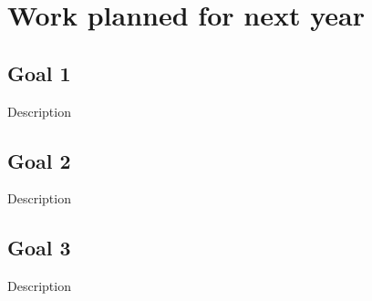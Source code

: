 \documentclass[letterpaper,11pt]{article}
\begin{document}
\section{Work planned for next year}
\subsection{Goal 1}
Description

\subsection{Goal 2}
Description

\subsection{Goal 3}
Description








\end{document}
